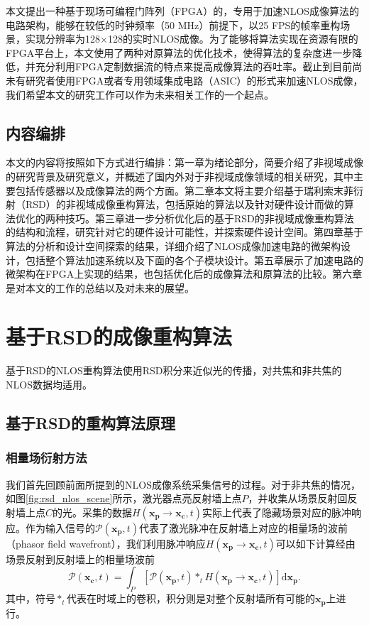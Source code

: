 \documentclass[master]{shtthesis}             %
\begin{document}
本文提出一种基于现场可编程门阵列（FPGA）的，专用于加速NLOS成像算法的电路架构，能够在较低的时钟频率（50 MHz）前提下，以25 FPS的帧率重构场景，实现分辨率为128$\times$128的实时NLOS成像。为了能够将算法实现在资源有限的FPGA平台上，本文使用了两种对原算法的优化技术，使得算法的复杂度进一步降低，并充分利用FPGA定制数据流的特点来提高成像算法的吞吐率。截止到目前尚未有研究者使用FPGA或者专用领域集成电路（ASIC）的形式来加速NLOS成像，我们希望本文的研究工作可以作为未来相关工作的一个起点。

\section{内容编排}

本文的内容将按照如下方式进行编排：第一章为绪论部分，简要介绍了非视域成像的研究背景及研究意义，并概述了国内外对于非视域成像领域的相关研究，其中主要包括传感器以及成像算法的两个方面。第二章本文将主要介绍基于瑞利索末菲衍射（RSD）的非视域成像重构算法，包括原始的算法以及针对硬件设计而做的算法优化的两种技巧。第三章进一步分析优化后的基于RSD的非视域成像重构算法的结构和流程，研究针对它的硬件设计可能性，并探索硬件设计空间。第四章基于算法的分析和设计空间探索的结果，详细介绍了NLOS成像加速电路的微架构设计，包括整个算法加速系统以及下面的各个子模块设计。第五章展示了加速电路的微架构在FPGA上实现的结果，也包括优化后的成像算法和原算法的比较。第六章是对本文的工作的总结以及对未来的展望。

\chapter{基于RSD的成像重构算法}
 
基于RSD的NLOS重构算法使用RSD积分来近似光的传播，对共焦和非共焦的NLOS数据均适用\citep{Elten2019}。

\section{基于RSD的重构算法原理}\label{sec:rsd_recons_pp}

\subsection{相量场衍射方法}

我们首先回顾前面所提到的NLOS成像系统采集信号的过程。对于非共焦的情况，如图\ref{fig:rsd_nlos_scene}所示，激光器点亮反射墙上点$P$，并收集从场景反射回反射墙上点$C$的光。采集的数据$H(\mathbf{x_p}\rightarrow \mathbf{x_c},t)$实际上代表了隐藏场景对应的脉冲响应。作为输入信号的$\mathcal{P}(\mathbf{x_p},t)$代表了激光脉冲在反射墙上对应的相量场的波前（phasor field wavefront），我们利用脉冲响应$H(\mathbf{x_p}\rightarrow \mathbf{x_c},t)$可以如下计算经由场景反射到反射墙上的相量场波前
\begin{equation}\label{eq:convt}
  \mathcal{P}(\mathbf{x_c},t) = \int_P \left[ \mathcal{P}(\mathbf{x_p},t) *_t H(\mathbf{x_p}\rightarrow \mathbf{x_c},t) \right] \text{d}\mathbf{x_p}.
\end{equation}
其中，符号$*_t$代表在时域上的卷积，积分则是对整个反射墙所有可能的$\mathbf{x_p}$上进行。
\end{document}
